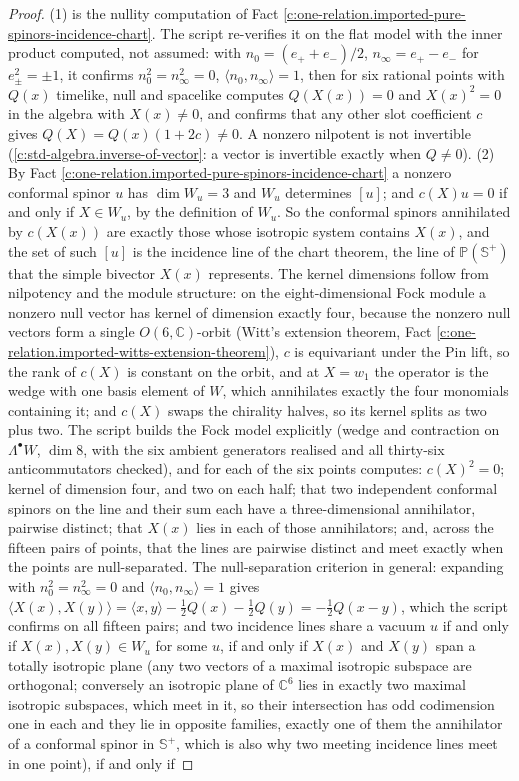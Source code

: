 \documentclass[11pt]{article}
\theoremstyle{definition}
\theoremstyle{plain}
\providecommand{\C}{}\renewcommand{\C}{\mathbb{C}}
\providecommand{\CS}{}\renewcommand{\CS}{{\mathbb{S}^{+}}}
\providecommand{\ip}{}\renewcommand{\ip}[2]{\langle #1, #2\rangle}
\begin{document}
\begin{proof}
(1) is the nullity computation of Fact \ref{c:one-relation.imported-pure-spinors-incidence-chart}. The script re-verifies it on the flat model with the inner product computed, not assumed: with $n_{0} = (e_{+} + e_{-})/2$, $n_{\infty} = e_{+} - e_{-}$ for $e_{\pm}^{2} = \pm 1$, it confirms $n_{0}^{2} = n_{\infty}^{2} = 0$, $\ip{n_{0}}{n_{\infty}} = 1$, then for six rational points with $Q(x)$ timelike, null and spacelike computes $Q(X(x)) = 0$ and $X(x)^{2} = 0$ in the algebra with $X(x) \neq 0$, and confirms that any other slot coefficient $c$ gives $Q(X) = Q(x)(1 + 2c) \neq 0$. A nonzero nilpotent is not invertible (\ref{c:std-algebra.inverse-of-vector}: a vector is invertible exactly when $Q \neq 0$). (2) By Fact \ref{c:one-relation.imported-pure-spinors-incidence-chart} a nonzero conformal spinor $u$ has $\dim W_{u} = 3$ and $W_{u}$ determines $[u]$; and $c(X)u = 0$ if and only if $X \in W_{u}$, by the definition of $W_{u}$. So the conformal spinors annihilated by $c(X(x))$ are exactly those whose isotropic system contains $X(x)$, and the set of such $[u]$ is the incidence line of the chart theorem, the line of $\mathbb{P}(\CS)$ that the simple bivector $X(x)$ represents. The kernel dimensions follow from nilpotency and the module structure: on the eight-dimensional Fock module a nonzero null vector has kernel of dimension exactly four, because the nonzero null vectors form a single $O(6,\C)$-orbit (Witt's extension theorem, Fact \ref{c:one-relation.imported-witts-extension-theorem}), $c$ is equivariant under the Pin lift, so the rank of $c(X)$ is constant on the orbit, and at $X = w_{1}$ the operator is the wedge with one basis element of $W$, which annihilates exactly the four monomials containing it; and $c(X)$ swaps the chirality halves, so its kernel splits as two plus two. The script builds the Fock model explicitly (wedge and contraction on $\Lambda^{\bullet}W$, $\dim 8$, with the six ambient generators realised and all thirty-six anticommutators checked), and for each of the six points computes: $c(X)^{2} = 0$; kernel of dimension four, and two on each half; that two independent conformal spinors on the line and their sum each have a three-dimensional annihilator, pairwise distinct; that $X(x)$ lies in each of those annihilators; and, across the fifteen pairs of points, that the lines are pairwise distinct and meet exactly when the points are null-separated. The null-separation criterion in general: expanding with $n_{0}^{2} = n_{\infty}^{2} = 0$ and $\ip{n_{0}}{n_{\infty}} = 1$ gives $\ip{X(x)}{X(y)} = \ip{x}{y} - \tfrac12 Q(x) - \tfrac12 Q(y) = -\tfrac12 Q(x-y)$, which the script confirms on all fifteen pairs; and two incidence lines share a vacuum $u$ if and only if $X(x), X(y) \in W_{u}$ for some $u$, if and only if $X(x)$ and $X(y)$ span a totally isotropic plane (any two vectors of a maximal isotropic subspace are orthogonal; conversely an isotropic plane of $\C^{6}$ lies in exactly two maximal isotropic subspaces, which meet in it, so their intersection has odd codimension one in each and they lie in opposite families, exactly one of them the annihilator of a conformal spinor in $\CS$, which is also why two meeting incidence lines meet in one point), if and only if 
\end{proof}
\end{document}
